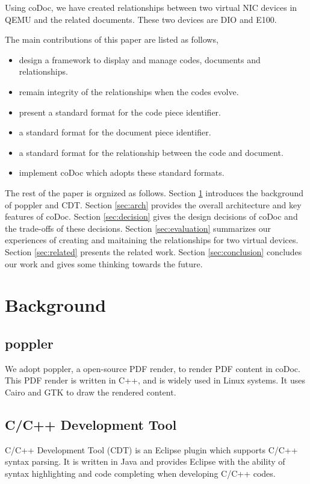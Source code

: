 \documentclass[11pt,letterpaper,oneside]{article}
\begin{document}
Using coDoc, we have created relationships between two virtual NIC devices in QEMU and the related documents.
These two devices are DIO \cite{dio} and E100.

The main contributions of this paper are listed as follows,
\begin{itemize}
\item design a framework to display and manage codes, documents and relationships.
\item remain integrity of the relationships when the codes evolve.
\item present a standard format for the code piece identifier.
\item a standard format for the document piece identifier.
\item a standard format for the relationship between the code and document.
\item implement coDoc which adopts these standard formats.
\end{itemize}

The rest of the paper is orgnized as follows. 
Section \ref{sec:background} introduces the background of poppler and CDT.
Section \ref{sec:arch} provides the overall architecture and key features of coDoc.
Section \ref{sec:decision} gives the design decisions of coDoc and the trade-offs of these decisions.
Section \ref{sec:evaluation} summarizes our experiences of creating and maitaining the relationships for two virtual devices.
Section \ref{sec:related} presents the related work.
Section \ref{sec:conclusion} concludes our work and gives some thinking towards the future.


\section{Background}
\label{sec:background}
\subsection{poppler}
We adopt poppler, a open-source PDF render, to render PDF content in coDoc.
This PDF render is written in C++, 
and is widely used in Linux systems.
It uses Cairo and GTK to draw the rendered content.

\subsection{C/C++ Development Tool}
C/C++ Development Tool (CDT) is an Eclipse plugin which supports C/C++ syntax parsing.
It is written in Java and provides Eclipse with the ability of syntax highlighting and code completing when developing C/C++ codes.
\end{document}
